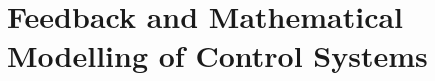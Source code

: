 \documentclass[../course]{subfiles}
\begin{document}
\chapter{Feedback and Mathematical Modelling of Control Systems}


\end{document}
